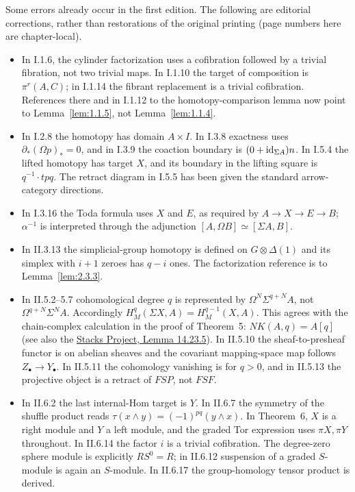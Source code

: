 \documentclass[../main]{subfiles}
\begin{document}
Some errors already occur in the first edition. The following are editorial
corrections, rather than restorations of the original printing (page numbers
here are chapter-local).
\begin{itemize}
  \item In I.1.6, the cylinder factorization uses a cofibration followed by a
  trivial fibration, not two trivial maps. In I.1.10 the target of composition
  is $\pi^r(A,C)$; in I.1.14 the fibrant replacement is a trivial cofibration.
  References there and in I.1.12 to the homotopy-comparison lemma now point to
  Lemma~\ref{lem:1.1.5}, not Lemma~\ref{lem:1.1.4}.
  \item In I.2.8 the homotopy has domain $A\times I$. In I.3.8 exactness uses
  $\partial_*(\Omega p)_*=0$, and in I.3.9 the coaction boundary is
  $(0+\operatorname{id}_{\Sigma A})n$. In I.5.4 the lifted homotopy has target $X$,
  and its boundary in the lifting square is $q^{-1}\cdot tpq$.
  The retract diagram in I.5.5 has been given the standard arrow-category directions.
  \item In I.3.16 the Toda formula uses $X$ and $E$, as required by
  $A\to X\to E\to B$; $\alpha^{-1}$ is interpreted through the adjunction
  $[A,\Omega B]\simeq[\Sigma A,B]$.
  \item In II.3.13 the simplicial-group homotopy is defined on
  $G\otimes\Delta(1)$ and its simplex with $i+1$ zeroes has $q-i$ ones.
  The factorization reference is to Lemma~\ref{lem:2.3.3}.
  \item In II.5.2--5.7 cohomological degree $q$ is represented by
  $\Omega^N\Sigma^{q+N}A$, not $\Omega^{q+N}\Sigma^N A$.
  Accordingly $H_M^q(\Sigma X,A)=H_M^{q-1}(X,A)$. This agrees with
  the chain-complex calculation in the proof of Theorem~5:
  $NK(A,q)=A[q]$ (see also the
  \href{https://stacks.math.columbia.edu/tag/0199}{Stacks Project, Lemma 14.23.5}).
  In II.5.10 the sheaf-to-presheaf functor is on abelian sheaves and the
  covariant mapping-space map follows $Z_\bullet\to Y_\bullet$.
  In II.5.11 the cohomology vanishing is for $q>0$, and in II.5.13
  the projective object is a retract of $FSP$, not $FSF$.
  \item In II.6.2 the last internal-Hom target is $Y$.
  In II.6.7 the symmetry of the shuffle product reads
  $\tau(x\wedge y)=(-1)^{pq}(y\wedge x)$.
  In Theorem~6, $X$ is a right module and $Y$ a left module,
  and the graded Tor expression uses $\pi X,\pi Y$ throughout.
  In II.6.14 the factor $i$ is a trivial cofibration.
  The degree-zero sphere module is explicitly $RS^0=R$; in II.6.12
  suspension of a graded $S$-module is again an $S$-module.
  In II.6.17 the group-homology tensor product is derived.
\end{itemize}
\end{document}
